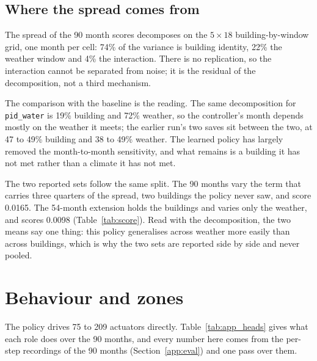 \documentclass{article}
\begin{document}
\subsection{Where the spread comes from}
\label{app:variance}

The spread of the 90 month scores decomposes on the $5\times18$ building-by-window grid, one month per cell: 74\% of the variance is building identity, 22\% the weather window and 4\% the interaction. There is no replication, so the interaction cannot be separated from noise; it is the residual of the decomposition, not a third mechanism.

The comparison with the baseline is the reading. The same decomposition for \texttt{pid\_water} is 19\% building and 72\% weather, so the controller's month depends mostly on the weather it meets; the earlier run's two saves sit between the two, at 47 to 49\% building and 38 to 49\% weather. The learned policy has largely removed the month-to-month sensitivity, and what remains is a building it has not met rather than a climate it has not met.

The two reported sets follow the same split. The 90 months vary the term that carries three quarters of the spread, two buildings the policy never saw, and score 0.0165. The 54-month extension holds the buildings and varies only the weather, and scores 0.0098 (Table~\ref{tab:score}). Read with the decomposition, the two means say one thing: this policy generalises across weather more easily than across buildings, which is why the two sets are reported side by side and never pooled.

\section{Behaviour and zones}
\label{app:behaviour}

The policy drives 75 to 209 actuators directly. Table~\ref{tab:app_heads} gives what each role does over the 90 months, and every number here comes from the per-step recordings of the 90 months (Section~\ref{app:eval}) and one pass over them.
\end{document}
